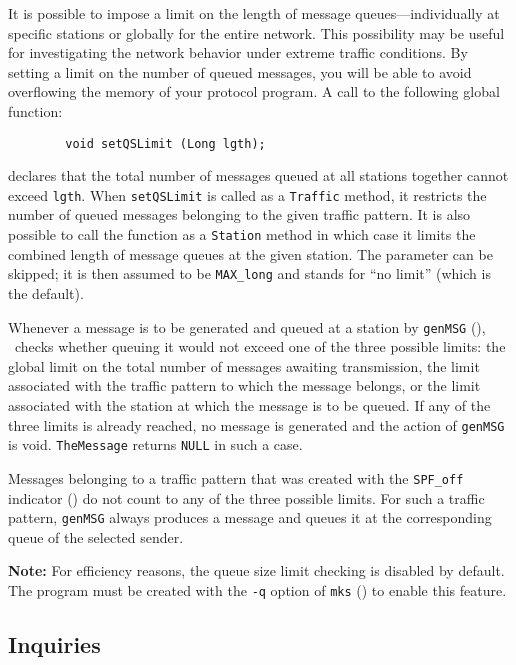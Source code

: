 It is possible to impose a limit on the length of message queues---individually
at specific stations or globally for the entire network.
This possibility may be useful for investigating the network behavior under
extreme traffic conditions.
By setting a limit on the number of queued messages, you will be able to avoid
overflowing the memory of your protocol program.
A call to the following global function:
\begin{verbatim}
        void setQSLimit (Long lgth);
\end{verbatim}
declares that the total number of messages queued at all stations
together cannot exceed {\tt lgth}.
When {\tt setQSLimit} is called as a {\tt Traffic} method, it restricts the
number of queued messages belonging to the given traffic pattern.
It is also possible to call the function as a {\tt Station} method in which
case it limits the combined length of message queues at the given station.
The parameter can be skipped; it is then assumed to be {\tt MAX\_long} and
stands for ``no limit'' (which is the default).

Whenever a message is to be generated and queued at a station by
{\tt genMSG} (), \smurph\ checks whether queuing it
would not exceed one of the three possible limits: the global limit
on the total number of messages awaiting transmission, the limit associated
with the traffic pattern to which the message belongs, or the limit
associated with the station at which the message is to be queued.
If any of the three limits is already reached, no message is generated
and the action of {\tt genMSG} is void.
{\tt TheMessage} returns {\tt NULL} in such a case.

Messages belonging to
a traffic pattern that was created with the {\tt SPF\_off} indicator
() do not count to any of the three possible limits.
For such a traffic pattern, {\tt genMSG} always produces a message and
queues it at the corresponding queue of the selected sender.

\medskip

\noindent
{\bf Note:}
For efficiency reasons, the queue size limit checking is
disabled by default.
The program must be created with the {\tt -q} option of {\tt mks}
() to enable this feature.

\subsection{Inquiries}
\label{rm_cl_in}

